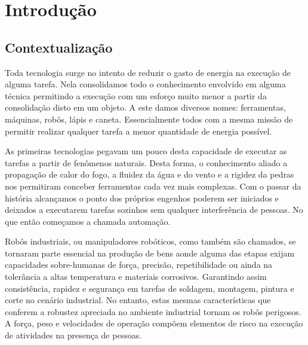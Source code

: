 \chapter{Introdução} \label{ch:intro}



\section{Contextualização}

Toda tecnologia surge no intento de reduzir o gasto de energia na execução de alguma tarefa. Nela consolidamos todo o conhecimento envolvido em alguma técnica permitindo a execução com um esforço muito menor a partir da consolidação disto em um objeto. A este damos diversos nomes: ferramentas, máquinas, robôs, lápis e caneta. Essencialmente todos com a mesma missão de permitir realizar qualquer tarefa a menor quantidade de energia possível.

As primeiras tecnologias pegavam um pouco desta capacidade de executar as tarefas a partir de fenômenos naturais. Desta forma, o conhecimento aliado a propagação de calor do fogo, a fluidez da água e do vento e a rigidez da pedras nos permitiram conceber ferramentas cada vez mais complexas. Com o passar da história alcançamos o ponto dos próprios engenhos poderem ser iniciados e deixados a executarem tarefas sozinhos sem qualquer interferência de pessoas. No que então começamos a chamada automação.



Robôs industriais, ou manipuladores robóticos, como também são chamados, se tornaram parte essencial na produção de bens aonde alguma das etapas exijam capacidades sobre-humanas de força, precisão, repetibilidade ou ainda na tolerância a altas temperatura e materiais corrosivos. Garantindo assim consistência, rapidez e segurança em tarefas de soldagem, montagem, pintura e corte no cenário industrial. No entanto, estas mesmas características que conferem a robustez apreciada no ambiente industrial tornam os robôs perigosos. A força, peso e velocidades de operação compõem elementos de risco na execução de atividades na presença de pessoas.

